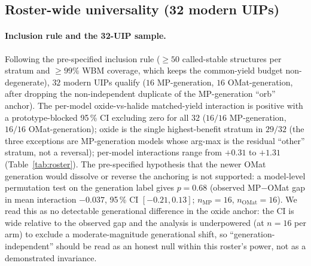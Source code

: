 \documentclass[aip,jcp,preprint,superscriptaddress,amsmath,amssymb]{revtex4-2}
\begin{document}
\subsection{Roster-wide universality (32 modern UIPs)}
\label{sec:roster-universality}
\paragraph{Inclusion rule and the 32-UIP sample.} Following the pre-specified inclusion rule
($\ge\!50$ called-stable structures per stratum and $\ge\!99\%$ WBM coverage, which keeps the
common-yield budget non-degenerate), $32$ modern UIPs qualify ($16$ MP-generation, $16$
OMat-generation, after dropping the non-independent duplicate of the MP-generation ``orb'' anchor).
The per-model oxide-vs-halide matched-yield interaction is positive with a prototype-blocked
95\,\% CI excluding zero for all $32$ ($16/16$ MP-generation, $16/16$ OMat-generation);
oxide is the single highest-benefit stratum in $29/32$ (the three exceptions are
MP-generation models whose arg-max is the residual ``other'' stratum, not a reversal);
per-model interactions range from $+0.31$ to $+1.31$ (Table~\ref{tab:roster}). The
pre-specified hypothesis that the newer OMat generation would dissolve or reverse the anchoring
is not supported: a model-level permutation test on the generation label gives $p = 0.68$
(observed MP$-$OMat gap in mean interaction $-0.037$, 95\,\% CI $[-0.21, 0.13]$; $n_{\mathrm{MP}} = 16$,
$n_{\mathrm{OMat}} = 16$). We read this as no detectable generational difference in the oxide anchor:
the CI is wide relative to the observed gap and the analysis is underpowered (at $n=16$ per arm) to
exclude a moderate-magnitude generational shift, so ``generation-independent'' should be read as
an honest null within this roster's power, not as a demonstrated invariance.
\end{document}
